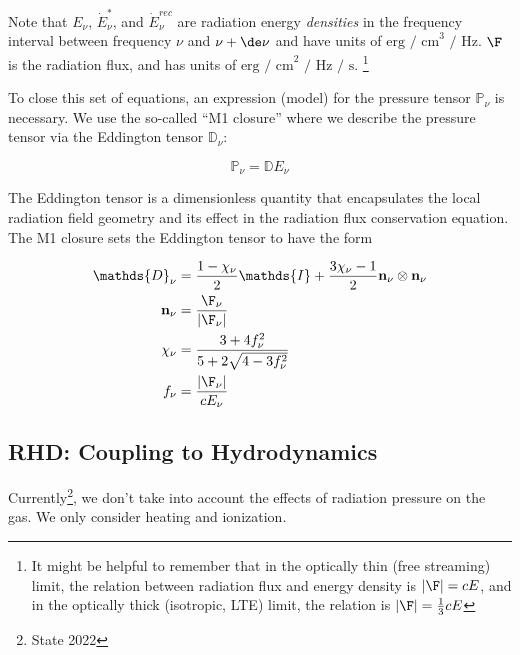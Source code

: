 Note that $E_\nu$, $\dot{E}^*_\nu$, and $\dot{E}^{rec}_\nu$ are radiation energy
\emph{densities} in the frequency interval between frequency $\nu$ and $\nu +
\de \nu$ and have units of $\text{erg / cm}^3 \text{ / Hz}$.
$\F$ is the radiation flux, and has units of $\text{erg / cm}^2 \text{ / Hz / s}$.
\footnote{
    It might be helpful to remember that in the optically thin (free streaming)
    limit, the relation between radiation flux and energy density is $|\F| = c
    E$, and in the optically thick (isotropic, LTE) limit, the relation is $|\F|
    = \frac{1}{3}c E$
}


To close this set of equations, an expression (model) for the pressure tensor
$\mathds{P}_\nu$ is necessary.  We use the so-called ``M1 closure'' 
\citep{levermoreRelatingEddingtonFactors1984a} where we
describe the pressure tensor via the Eddington tensor $\mathds{D}_\nu$:

\begin{equation}
	\mathds{P}_\nu = \mathds{D} E_\nu
\end{equation}

The Eddington tensor is a dimensionless quantity that encapsulates the local
radiation field geometry and its effect in the radiation flux conservation equation.
The M1 closure sets the Eddington tensor to have the form

\begin{align}
	\mathds{D}_\nu &=
        \frac{1- \chi_\nu}{2} \mathds{I} + \frac{3 \chi_\nu - 1}{2} \mathbf{n}_\nu \otimes \mathbf{n}_\nu \label{eq:eddington-freq} \\
	\mathbf{n}_\nu &=
        \frac{\F_\nu}{|\F_\nu|} \\
	\chi_\nu &=
        \frac{3 + 4 f_\nu ^2}{5 + 2 \sqrt{4 - 3 f_\nu^2}} \\
	f_\nu &=
        \frac{|\F_\nu|}{c E_\nu}
\end{align}









\subsection{RHD: Coupling to Hydrodynamics}

Currently\footnote{State 2022}, we don't take into account the effects of radiation pressure on the
gas. We only consider heating and ionization.

